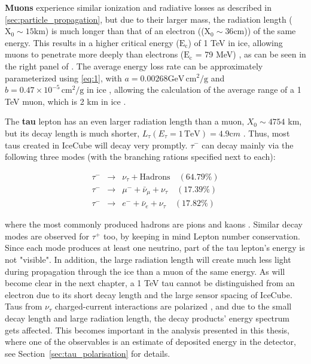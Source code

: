 \textbf{Muons} experience similar ionization and radiative losses as described in \ref{sec:particle_propagation}, but due to their larger mass, the radiation length ($\mathrm{X}_0 \sim 15 \mathrm{km}$) is much longer than that of an electron (($\mathrm{X}_0 \sim 36 \mathrm{cm}$)) of the same energy. This results in a higher critical energy ($\mathrm{E}_\mathrm{c}$) of 1 TeV in ice, allowing muons to penetrate more deeply than electrons ($\mathrm{E}_\mathrm{c}$ = 79 MeV) \cite{MMC_paper}, as can be seen in the right panel of . The average energy loss rate can be approximately parameterized using \ref{eq:1}, with $a = 0.00268 \mathrm{GeV}\, \mathrm{cm}^2/\mathrm{g}$ and $b = 0.47 \times 10^{-5} \, \mathrm{cm}^2/\mathrm{g}$ in ice \cite{PDG_2024}, allowing the calculation of the average range of a 1 TeV muon, which is 2 km in ice .

The \textbf{tau} lepton has an even larger radiation length than a muon, $X_0 \sim 4754$ km, but its decay length is much shorter, $L_{\tau} (E_{\tau} = 1 \, \text{TeV}) = 4.9 \mathrm cm$ \cite{PDG_2024}. Thus, most taus created in IceCube will decay very promptly. $\tau^{-}$ can decay mainly via the following three modes (with the branching rations specified next to each):


\begin{equation}\label{eq:tau_decay}
    \begin{array}{rcl}
        \tau^{-} &\rightarrow& \nu_{\tau} + \text{Hadrons} \quad (64.79\%) \\
        \tau^{-} &\rightarrow& \mu^{-} + \bar{\nu}_{\mu} + \nu_{\tau} \quad (17.39\%) \\
        \tau^{-} &\rightarrow& e^{-} + \bar{\nu}_{e} + \nu_{\tau} \quad (17.82\%)
    \end{array}
\end{equation}
    
where the most commonly produced hadrons are pions and kaons \cite{PDG_2024}. Similar decay modes are observed for  $\tau^{+}$ too, by keeping in mind Lepton number conservation. Since each mode produces at least one neutrino, part of the tau lepton's energy is not "visible". In addition, the large radiation length will create much less light during propagation through the ice than a muon of the same energy. As will become clear in the next chapter, a 1 TeV tau cannot be distinguished from an electron due to its short decay length and the large sensor spacing of IceCube. Taus from $\nu_{\tau}$ charged-current interactions are polarized , and due to the small decay length and large radiation length, the decay products' energy spectrum gets affected. This becomes important in the analysis presented in this thesis, where one of the observables is an estimate of deposited energy in the detector, see Section~\ref{sec:tau_polarisation} for details.


